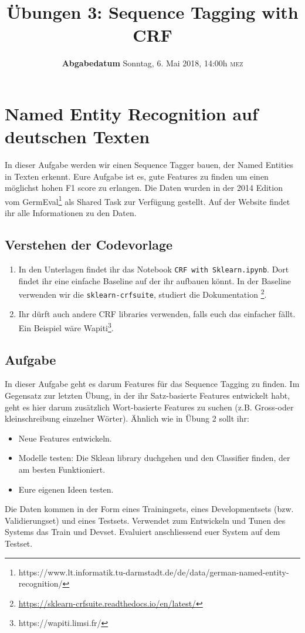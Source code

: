 \documentclass[a4paper,10pt]{article}
\title{Übungen 3: Sequence Tagging with CRF}
\date{\textbf{Abgabedatum} Sonntag, 6. Mai 2018, 14:00h \textsc{mez}
}
\newcommand{\punkte}[1]{(\emph{#1 p})}
\begin{document}
\maketitle


\section{Named Entity Recognition auf deutschen Texten}
In dieser Aufgabe werden wir einen Sequence Tagger bauen, der Named Entities in Texten erkennt. Eure Aufgabe ist es, gute Features zu finden um einen möglichst hohen F1 score zu erlangen. Die Daten wurden in der 2014 Edition vom GermEval\footnote{https://www.lt.informatik.tu-darmstadt.de/de/data/german-named-entity-recognition/} als Shared Task zur Verfügung gestellt. Auf der Website findet ihr alle Informationen zu den Daten.

\subsection{Verstehen der Codevorlage}
\begin{enumerate}
\item In den Unterlagen findet ihr das Notebook \texttt{CRF with Sklearn.ipynb}. Dort findet ihr eine einfache Baseline auf der ihr aufbauen könnt. In der Baseline verwenden wir die \lstinline!sklearn-crfsuite!, studiert die Dokumentation \footnote{\url{https://sklearn-crfsuite.readthedocs.io/en/latest/}}. 
\item Ihr dürft auch andere CRF libraries verwenden, falls euch das einfacher fällt. Ein Beispiel wäre Wapiti\footnote{https://wapiti.limsi.fr/}.
\end{enumerate}

\subsection{Aufgabe}
In dieser Aufgabe geht es darum Features für das Sequence Tagging zu finden. Im Gegensatz zur letzten Übung, in der ihr Satz-basierte Features entwickelt habt, geht es hier darum zusätzlich Wort-basierte Features zu suchen (z.B. Gross-oder kleinschreibung einzelner Wörter). Ähnlich wie in Übung 2 sollt ihr:
\begin{itemize}
\item Neue Features entwickeln.
\item Modelle testen: Die Sklean library duchgehen und den Classifier finden, der am besten Funktioniert.
\item Eure eigenen Ideen testen.
\end{itemize}
Die Daten kommen in der Form eines Trainingsets, eines Developmentsets (bzw. Validierungset) und eines Testsets. Verwendet zum Entwickeln und Tunen des Systems das Train und Devset. Evaluiert anschliessend euer System auf dem Testset. 
\end{document}

